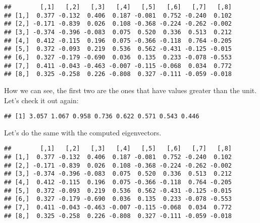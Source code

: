\documentclass[
]{article}
\newenvironment{Shaded}{\begin{snugshade}}{\end{snugshade}}
\newcommand{\DecValTok}[1]{\textcolor[rgb]{0.00,0.00,0.81}{#1}}
\newcommand{\FunctionTok}[1]{\textcolor[rgb]{0.00,0.00,0.00}{#1}}
\newcommand{\NormalTok}[1]{#1}
\newcommand{\SpecialCharTok}[1]{\textcolor[rgb]{0.00,0.00,0.00}{#1}}
\begin{document}
\begin{verbatim}
##        [,1]   [,2]   [,3]   [,4]   [,5]   [,6]   [,7]   [,8]
## [1,]  0.377 -0.132  0.406  0.187 -0.081  0.752 -0.240  0.102
## [2,] -0.171 -0.839  0.026  0.108 -0.368 -0.224 -0.262 -0.002
## [3,] -0.374 -0.396 -0.083  0.075  0.520  0.336  0.513  0.212
## [4,]  0.412 -0.115  0.196  0.075 -0.366 -0.118  0.764 -0.205
## [5,]  0.372 -0.093  0.219  0.536  0.562 -0.431 -0.125 -0.015
## [6,]  0.327 -0.179 -0.690  0.036  0.135  0.233 -0.078 -0.553
## [7,]  0.411 -0.043 -0.463 -0.007 -0.115 -0.068  0.034  0.772
## [8,]  0.325 -0.258  0.226 -0.808  0.327 -0.111 -0.059 -0.018
\end{verbatim}

How we can see, the first two are the ones that have values greater than
the unit. Let's check it out again:

\begin{Shaded}
\end{Shaded}

\begin{verbatim}
## [1] 3.057 1.067 0.958 0.736 0.622 0.571 0.543 0.446
\end{verbatim}

Let's do the same with the computed eigenvectors.

\begin{Shaded}
\end{Shaded}

\begin{verbatim}
##        [,1]   [,2]   [,3]   [,4]   [,5]   [,6]   [,7]   [,8]
## [1,]  0.377 -0.132  0.406  0.187 -0.081  0.752 -0.240  0.102
## [2,] -0.171 -0.839  0.026  0.108 -0.368 -0.224 -0.262 -0.002
## [3,] -0.374 -0.396 -0.083  0.075  0.520  0.336  0.513  0.212
## [4,]  0.412 -0.115  0.196  0.075 -0.366 -0.118  0.764 -0.205
## [5,]  0.372 -0.093  0.219  0.536  0.562 -0.431 -0.125 -0.015
## [6,]  0.327 -0.179 -0.690  0.036  0.135  0.233 -0.078 -0.553
## [7,]  0.411 -0.043 -0.463 -0.007 -0.115 -0.068  0.034  0.772
## [8,]  0.325 -0.258  0.226 -0.808  0.327 -0.111 -0.059 -0.018
\end{verbatim}
\end{document}
